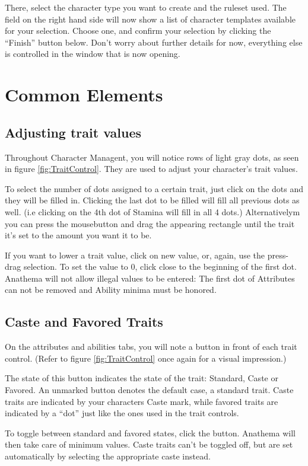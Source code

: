 There, select the character type you want to create and the ruleset used. The field on the right hand side will now show a list of character templates available for your selection. Choose one, and confirm your selection by clicking the "`Finish"' button below. Don't worry about further details for now, everything else is controlled in the window that is now opening.

\section{Common Elements}
\subsection{Adjusting trait values}
Throughout Character Managent, you will notice rows of light gray dots, as seen in figure \ref{fig:TraitControl}. They are used to adjust your character's trait values. 

To select the number of dots assigned to a certain trait, just click on the dots and they will be filled in. Clicking the last dot to be filled will fill all previous dots as well. (i.e clicking on the 4th dot of Stamina will fill in all 4 dots.)
Alternativelym you can press the mousebutton and drag the appearing rectangle until the trait it's set to the amount you want it to be. 

If you want to lower a trait value, click on new value, or, again, use the press-drag selection. To set the value to 0, click close to the beginning of the first dot. Anathema will not allow illegal values to be entered: The first dot of Attributes can not be removed and Ability minima must be honored.

\subsection{Caste and Favored Traits}
On the attributes and abilities tabs, you will note a button in front of each trait control. (Refer to figure \ref{fig:TraitControl} once again for a visual impression.)

The state of this button indicates the state of the trait: Standard, Caste or Favored. An unmarked button denotes the default case, a standard trait. Caste traits are indicated by your characters Caste mark, while favored traits are indicated by a "`dot"' just like the ones used in the trait controls.

To toggle between standard and favored states, click the button. Anathema will then take care of minimum values. Caste traits can't be toggled off, but are set automatically by selecting the appropriate caste instead.

